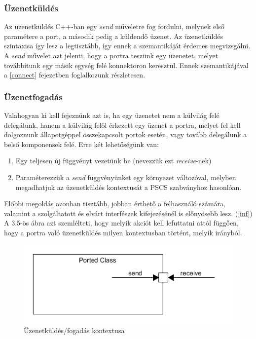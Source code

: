 \documentclass[a4paper,12pt]{report}
\begin{document}
\subsubsection{Üzenetküldés}
Az üzenetküldés C++-ban egy \textit{send} műveletre fog fordulni, melynek első paramétere a port, a második pedig a küldendő üzenet. Az üzenetküldés szintaxisa így lesz a legtisztább, így ennek a szemantikáját érdemes megvizsgálni. A \textit{send} művelet azt jelenti, hogy a portra teszünk egy üzenetet, melyet továbbítunk egy másik egység felé konnektoron keresztül. Ennek szemantikájával a \ref{connect} fejezetben foglalkozunk részletesen.

\subsubsection{Üzenetfogadás}
Valahogyan ki kell fejeznünk azt is, ha egy üzenetet nem a külvilág felé delegálunk, hanem a külvilág felől érkezett egy üzenet a portra, melyet fel kell dolgoznunk állapotgéppel összekapcsolt portok esetén, vagy tovább delegálunk a belső komponensek felé. Erre két lehetőségünk van:
\begin{enumerate}
\item Egy teljesen új függvényt vezetünk be (nevezzük ezt \textit{receive}-nek)
\item Paraméterezzük a \textit{send} függvényünket egy környezet változóval, melyben megadhatjuk az üzenetküldés kontextusát a PSCS szabványhoz hasonlóan.
\end{enumerate} 
Előbbi megoldás azonban tisztább, jobban érthető a felhasználó számára, valamint a szolgáltatott és elvárt interfészek kifejezésénél is előnyösebb lesz. (\ref{inf}) \\

A 3.5-ös ábra azt szemlélteti, hogy melyik akciót kell lefuttatni attól függően, hogy a portra való üzenetküldés milyen kontextusban történt, melyik irányból. \\

\begin{figure}[H]
\begin{center}
\includegraphics[scale=0.8]{send_rec.png}
\end{center}
\caption{Üzenetküldés/fogadás kontextusa}
\end{figure} 
\end{document}
